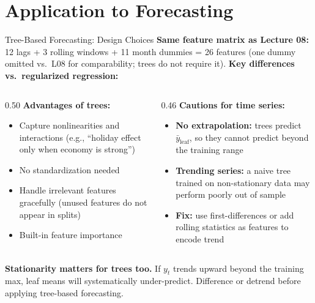 \documentclass[aspectratio=169, 10pt]{beamer}
\begin{document}
\section{Application to Forecasting}


\begin{frame}{Tree-Based Forecasting: Design Choices}
  \textbf{Same feature matrix as Lecture 08:}
  12 lags + 3 rolling windows + 11 month dummies = 26 features
  (one dummy omitted vs.\ L08 for comparability; trees do not require it).
  \textbf{Key differences vs.\ regularized regression:}
  \begin{columns}[T]
    \begin{column}{0.50\textwidth}
      \textbf{Advantages of trees:}
      \begin{itemize}
        \item Capture nonlinearities and interactions
              (e.g., ``holiday effect only when economy is strong'')
        \item No standardization needed
        \item Handle irrelevant features gracefully
              (unused features do not appear in splits)
        \item Built-in feature importance
      \end{itemize}
    \end{column}
    \begin{column}{0.46\textwidth}
      \textbf{Cautions for time series:}
      \begin{itemize}
        \item \textbf{No extrapolation:} trees predict
              $\bar{y}_{\text{leaf}}$, so they cannot predict
              beyond the training range
        \item \textbf{Trending series:} a naive tree trained on
              non-stationary data may perform poorly out of sample
        \item \textbf{Fix:} use first-differences or add rolling
              statistics as features to encode trend
      \end{itemize}
    \end{column}
  \end{columns}
  \begin{warningbox}
    \textbf{Stationarity matters for trees too.}
    If $y_t$ trends upward beyond the training max,
    leaf means will systematically under-predict.
    Difference or detrend before applying tree-based forecasting.
  \end{warningbox}
\end{frame}
\end{document}
